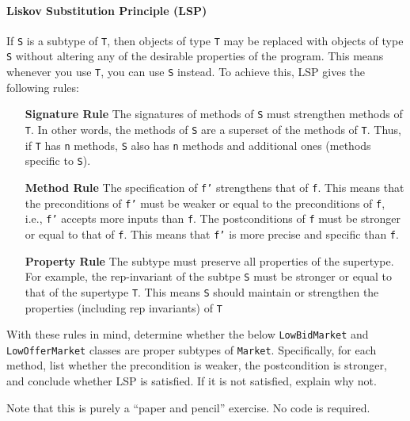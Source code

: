 \documentclass[10pt]{article}
\newcommand{\code}[1]{\texttt{#1}}
\begin{document}
\paragraph{Liskov Substitution Principle (LSP)} If \code{S} is a subtype of \code{T}, then objects of type \code{T} may be replaced with objects of type \code{S} without altering any of the desirable properties of the program. This means whenever you use \code{T}, you can use \code{S} instead. To achieve this, LSP gives the following rules:

\begin{itemize}
\item[\textbf{Signature Rule}] The signatures of methods of \code{S} must strengthen methods of \code{T}. In other words, the methods of \code{S} are a superset of the methods of \code{T}. Thus, if \code{T} has \code{n} methods, \code{S} also has \code{n} methods and additional ones (methods specific to \code{S}). 

\item[\textbf{Method Rule}] The specification of \code{f'} strengthens that of \code{f}. This means that the preconditions of \code{f'} must be weaker or equal to the preconditions of \code{f}, i.e.,  \code{f'} accepts more inputs than \code{f}.  The postconditions of \code{f} must be stronger or equal to that of \code{f}. This means that \code{f'} is more precise and specific than \code{f}.

\item[\textbf{Property Rule}] The subtype must preserve all properties of the supertype.  For example, the rep-invariant of the subtpe \code{S} must be stronger or equal to that of the supertype \code{T}. This means \code{S} should maintain or strengthen the properties (including rep invariants) of \code{T}
\end{itemize}


With these rules in mind, determine whether the below \code{LowBidMarket} and \code{LowOfferMarket} classes are proper subtypes of \code{Market}. Specifically, for each method, list whether the precondition is weaker, the postcondition is stronger, and conclude whether LSP is satisfied.  If it is not satisfied, explain why not.

Note that this is purely a ``paper and pencil'' exercise. No code is required.
\end{document}
